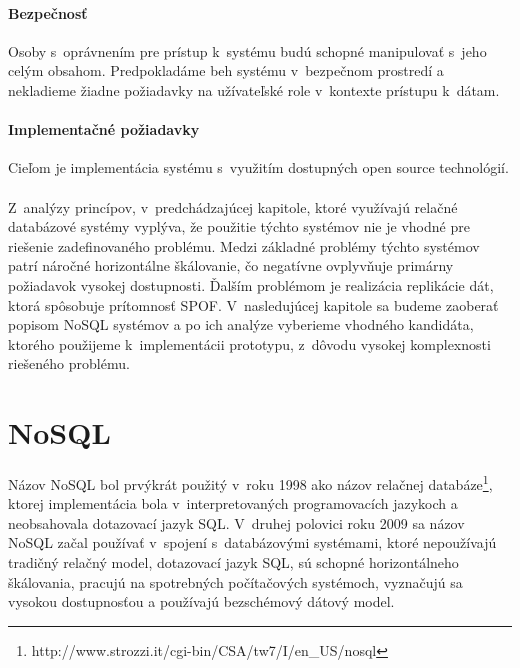 \documentclass[11pt,twoside,a4paper]{book}
\begin{document}
\subsubsection*{Bezpečnosť}
Osoby s~oprávnením pre prístup k~systému budú schopné manipulovať s~jeho celým obsahom. Predpokladáme beh systému v~bezpečnom prostredí a nekladieme žiadne požiadavky na užívateľské role v~kontexte prístupu k~dátam.

\subsubsection*{Implementačné požiadavky}
Cieľom je implementácia systému s~využitím dostupných open source technológií. 

\subsubsection*{}
Z~analýzy princípov, v~predchádzajúcej kapitole, ktoré využívajú relačné databázové systémy vyplýva, že použitie týchto systémov nie je vhodné pre riešenie zadefinovaného problému. Medzi základné problémy týchto systémov patrí náročné horizontálne škálovanie, čo negatívne ovplyvňuje primárny požiadavok vysokej dostupnosti. Ďalším problémom je realizácia replikácie dát, ktorá spôsobuje prítomnosť SPOF. V~nasledujúcej kapitole sa budeme zaoberať popisom NoSQL systémov a po ich analýze vyberieme vhodného kandidáta, ktorého použijeme k~implementácii prototypu, z~dôvodu vysokej komplexnosti riešeného problému.





\chapter{NoSQL}
\label{chapter:NoSQL}
Názov NoSQL bol prvýkrát použitý v~roku 1998 ako názov relačnej databáze\footnote{http://www.strozzi.it/cgi-bin/CSA/tw7/I/en\_US/nosql}, ktorej implementácia bola v~interpretovaných programovacích jazykoch a neobsahovala dotazovací jazyk SQL. V~druhej polovici roku 2009 sa názov NoSQL začal používať v~spojení s~databázovými systémami, ktoré nepoužívajú tradičný relačný model, dotazovací jazyk SQL, sú schopné horizontálneho škálovania, pracujú na spotrebných počítačových systémoch, vyznačujú sa vysokou dostupnosťou a používajú bezschémový dátový model.
\end{document}
